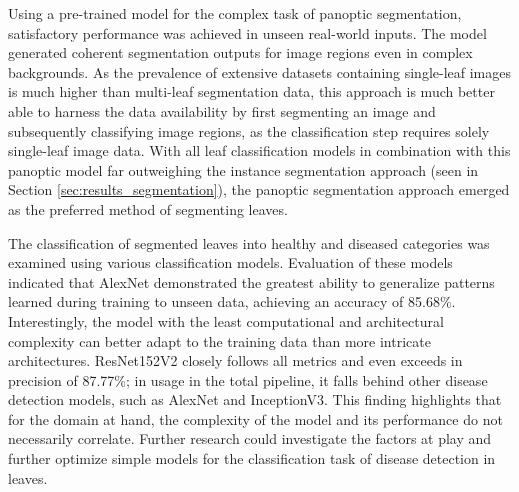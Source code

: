 \documentclass[draft,final]{vutinfth} %
\begin{document}
Using a pre-trained model for the complex task of panoptic segmentation, satisfactory performance was achieved in unseen real-world inputs. The model generated coherent segmentation outputs for image regions even in complex backgrounds. 
As the prevalence of extensive datasets containing single-leaf images is much higher than multi-leaf segmentation data, this approach is much better able to harness the data availability by first segmenting an image and subsequently classifying image regions, as the classification step requires solely single-leaf image data. 
With all leaf classification models in combination with this panoptic model far outweighing the instance segmentation approach (seen in Section \ref{sec:results_segmentation}), the panoptic segmentation approach emerged as the  preferred method of segmenting leaves.
\iffalse
Interestingly, the two best-performing leaf detection models (as highlighted in Section \ref{sec:results_segmentation_panoptic}), ResNet and Inception, used with SAM, did not perform as well in evaluating the total pipeline. Of the five best models, two of them used YOLOv8 as their leaf classification model, including the overall best-performing model. However, YOLOv8 exhibited far lower evaluation performance than the other two (recall and precision of 0.9579 and 0.9580 of ResNet versus YOLOv8's 0.7175 and 0.8028, respectively) in the synthetic dataset. This somewhat contradictory result could have multiple reasons. First, as mentioned before, the quality of the dataset used to evaluate the total pipeline could be a factor in this incoherence, further highlighting the necessity of an extensive leaf segmentation dataset. Another option is that specific models just "work better together", i.e., a specific model in disease detection is particularly suited for detecting diseases in leaf segments produced by a certain model in the leaf segmentation stage. The leaf area selection described in Section \ref{sec:results_total} could also play a role in these conflicting results. However, most likely, through its generalizability, given by its more intricate architecture, YOLOv8 emerged as the leaf classification model in the best-performing pipeline configuration, which also aligns with the results on the (incomplete and thus not as significant) real-world dataset seen in Section \ref{sec:results_segmentation}.
\fi
The classification of segmented leaves into healthy and diseased categories was examined using various classification models. Evaluation of these models indicated that AlexNet demonstrated the greatest ability to generalize patterns learned during training to unseen data, achieving an accuracy of 85.68\%. Interestingly, the model with the least computational and architectural complexity can better adapt to the training data than more intricate architectures. ResNet152V2 closely follows all metrics and even exceeds in precision of 87.77\%; in usage in the total pipeline, it falls behind other disease detection models, such as AlexNet and InceptionV3. This finding highlights that for the domain at hand, the complexity of the model and its performance do not necessarily correlate. Further research could investigate the factors at play and further optimize simple models for the classification task of disease detection in leaves.
\end{document}
